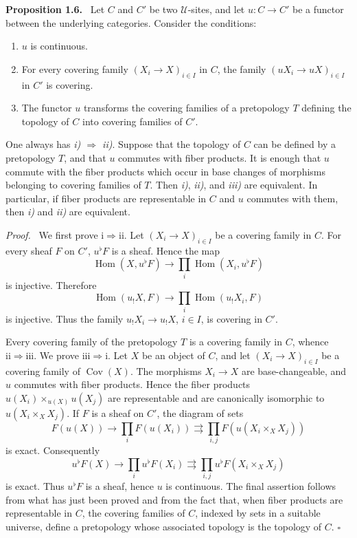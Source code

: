 \documentclass[11pt]{article}
\newcommand{\U}{\mathcal{U}}
\newcommand{\Hom}{\operatorname{Hom}}
\newcommand{\qedtext}{\hfill\(\square\)}
\newenvironment{statement}[1]{\par\medskip\noindent\textbf{#1.}\ }{\par\medskip}
\newenvironment{prooftext}{\par\noindent\emph{Proof.}\ }{\par\medskip}
\begin{document}
\begin{statement}{Proposition 1.6}
Let \(C\) and \(C'\) be two \(\U\)-sites, and let \(u:C\to C'\) be a functor between the underlying categories. Consider the conditions:
\begin{enumerate}[label=\roman*)]
\item \(u\) is continuous.
\item For every covering family \((X_i\to X)_{i\in I}\) in \(C\), the family \((uX_i\to uX)_{i\in I}\) in \(C'\) is covering.
\item The functor \(u\) transforms the covering families of a pretopology \(T\) defining the topology of \(C\) into covering families of \(C'\).
\end{enumerate}
One always has \emph{i) \(\Rightarrow\) ii)}. Suppose that the topology of \(C\) can be defined by a pretopology \(T\), and that \(u\) commutes with fiber products. It is enough that \(u\) commute with the fiber products which occur in base changes of morphisms belonging to covering families of \(T\). Then \emph{i)}, \emph{ii)}, and \emph{iii)} are equivalent. In particular, if fiber products are representable in \(C\) and \(u\) commutes with them, then \emph{i)} and \emph{ii)} are equivalent.
\end{statement}

\begin{prooftext}
We first prove \(\mathrm{i}\Rightarrow\mathrm{ii}\). Let \((X_i\to X)_{i\in I}\) be a covering family in \(C\). For every sheaf \(F\) on \(C'\), \(u^\flat F\) is a sheaf. Hence the map
\[
\Hom(X,u^\flat F)\longrightarrow\prod_i\Hom(X_i,u^\flat F)
\]
is injective. Therefore
\[
\Hom(u_!X,F)\longrightarrow\prod_i\Hom(u_!X_i,F)
\]
is injective. Thus the family \(u_!X_i\to u_!X\), \(i\in I\), is covering in \(C'\).

Every covering family of the pretopology \(T\) is a covering family in \(C\), whence \(\mathrm{ii}\Rightarrow\mathrm{iii}\). We prove \(\mathrm{iii}\Rightarrow\mathrm{i}\). Let \(X\) be an object of \(C\), and let \((X_i\to X)_{i\in I}\) be a covering family of \(\operatorname{Cov}(X)\). The morphisms \(X_i\to X\) are base-changeable, and \(u\) commutes with fiber products. Hence the fiber products \(u(X_i)\times_{u(X)}u(X_j)\) are representable and are canonically isomorphic to \(u(X_i\times_X X_j)\). If \(F\) is a sheaf on \(C'\), the diagram of sets
\[
F(u(X))\longrightarrow\prod_iF(u(X_i))\rightrightarrows\prod_{i,j}F(u(X_i\times_XX_j))
\]
is exact. Consequently
\[
u^\flat F(X)\longrightarrow\prod_i u^\flat F(X_i)\rightrightarrows\prod_{i,j}u^\flat F(X_i\times_X X_j)
\]
is exact. Thus \(u^\flat F\) is a sheaf, hence \(u\) is continuous. The final assertion follows from what has just been proved and from the fact that, when fiber products are representable in \(C\), the covering families of \(C\), indexed by sets in a suitable universe, define a pretopology whose associated topology is the topology of \(C\). \qedtext
\end{prooftext}
\end{document}
